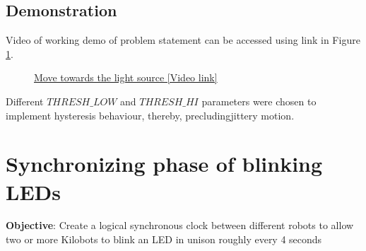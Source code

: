 \section{Demonstration}
Video of working demo of problem statement can be accessed using link in Figure \ref{fig:move_towards_the_light}.
\begin{figure}[H]
	\centering
	\caption{\href{https://www.google.com/url?sa=j&url=https\%3A\%2F\%2Fphotos.app.goo.gl\%2FnUNghDg4nJygpzUu5&uct=1551610784&usg=G0tZGJ7iMN79F5qGk1QMw5rfodM.}{Move towards the light source [Video link]}}
	\label{fig:move_towards_the_light}
\end{figure}
Different $THRESH\_LOW$ and $THRESH\_HI$ parameters were chosen to implement hysteresis behaviour, thereby, precludingjittery motion.


\chapter{Synchronizing phase of blinking LEDs}
\textbf{Objective}: Create a logical synchronous clock between different 
robots to allow two or more Kilobots to blink an LED in unison roughly every 4 seconds \\


